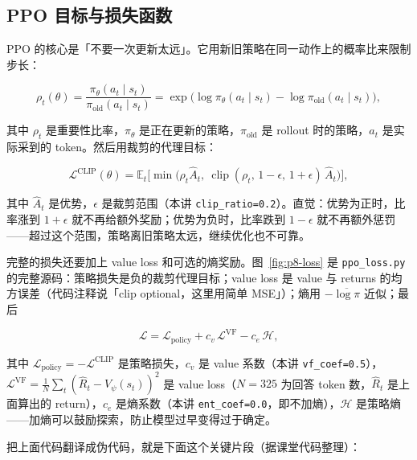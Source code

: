 \subsection{PPO 目标与损失函数}

PPO 的核心是「不要一次更新太远」。它用新旧策略在同一动作上的概率比来限制步长：

$$
\rho_t(\theta) = \frac{\pi_\theta(a_t \mid s_t)}{\pi_{\text{old}}(a_t \mid s_t)}
= \exp\!\Big(\log \pi_\theta(a_t\mid s_t) - \log \pi_{\text{old}}(a_t\mid s_t)\Big),
$$

其中 $\rho_t$ 是重要性比率，$\pi_\theta$ 是正在更新的策略，$\pi_{\text{old}}$ 是 rollout 时的策略，$a_t$ 是实际采到的 token。然后用裁剪的代理目标：

$$
\mathcal{L}^{\text{CLIP}}(\theta)
= \mathbb{E}_t\Big[\min\big(\rho_t \hat A_t,\ \operatorname{clip}(\rho_t,\,1-\epsilon,\,1+\epsilon)\,\hat A_t\big)\Big],
$$

其中 $\hat A_t$ 是优势，$\epsilon$ 是裁剪范围（本讲 \texttt{clip\_ratio=0.2}）。直觉：优势为正时，比率涨到 $1+\epsilon$ 就不再给额外奖励；优势为负时，比率跌到 $1-\epsilon$ 就不再额外惩罚——超过这个范围，策略离旧策略太远，继续优化也不可靠。

完整的损失还要加上 value loss 和可选的熵奖励。图~\ref{fig:p8-loss} 是 \texttt{ppo\_loss.py} 的完整源码：策略损失是负的裁剪代理目标；value loss 是 value 与 returns 的均方误差（代码注释说「clip optional，这里用简单 MSE」）；熵用 $-\overline{\log\pi}$ 近似；最后

$$
\mathcal{L} = \mathcal{L}_{\text{policy}} + c_v\,\mathcal{L}^{\text{VF}} - c_e\,\mathcal{H},
$$

其中 $\mathcal{L}_{\text{policy}}=-\mathcal{L}^{\text{CLIP}}$ 是策略损失，$c_v$ 是 value 系数（本讲 \texttt{vf\_coef=0.5}），$\mathcal{L}^{\text{VF}}=\frac{1}{N}\sum_t(\hat R_t - V_\psi(s_t))^2$ 是 value loss（$N=325$ 为回答 token 数，$\hat R_t$ 是上面算出的 return），$c_e$ 是熵系数（本讲 \texttt{ent\_coef=0.0}，即不加熵），$\mathcal{H}$ 是策略熵——加熵可以鼓励探索，防止模型过早变得过于确定。

把上面代码翻译成伪代码，就是下面这个关键片段（据课堂代码整理）：

